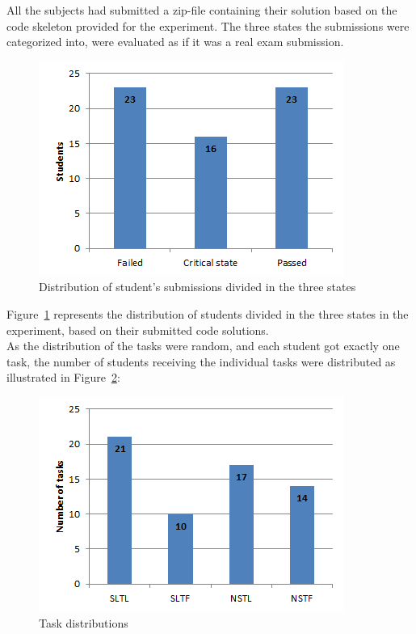 \documentclass{sig-alternate-05-2015}
\begin{document}
All the subjects had submitted a zip-file containing their solution based on the code skeleton provided for the experiment. The three states the submissions were categorized into, were evaluated as if it was a real exam submission.

\begin{figure}[!ht]
	\centering
	\includegraphics[width=1\linewidth]{img01}
	\caption{Distribution of student's submissions divided in the three states}
	\label{fig:DistributionOfStudentPerformance}
\end{figure}
Figure~\ref{fig:DistributionOfStudentPerformance} represents the distribution of students divided in the three states in the experiment, based on their submitted code solutions.\\

As the distribution of the tasks were random, and each student got exactly one task, the number of students receiving the individual tasks were distributed as illustrated in Figure~\ref{fig:TaskDistributions}:

\begin{figure}[!ht]
	\centering
	\includegraphics[width=1\linewidth]{img02}
	\caption{Task distributions}
	\label{fig:TaskDistributions}
\end{figure}
\end{document}
